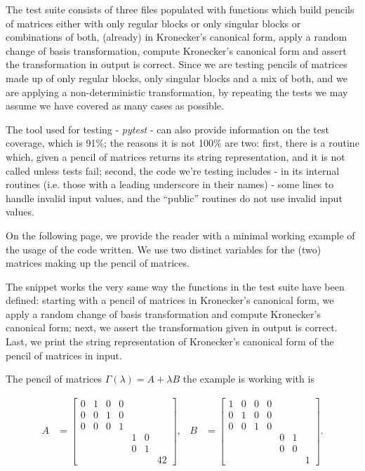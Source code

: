 The test suite consists of three files populated with functions which build pencils of matrices either with
only regular blocks or only singular blocks or combinations of both, (already) in Kronecker's canonical form,
apply a random change of basis transformation, compute Kronecker's canonical form and assert the transformation
in output is correct. Since we are testing pencils of matrices made up of only regular blocks, only singular blocks
and a mix of both, and we are applying a non-deterministic transformation, by repeating the tests we may assume
we have covered as many cases as possible.

The tool used for testing - \textit{pytest} - can also provide information on
the test coverage, which is 91\%; the reasons it is not 100\% are two: first, there is a routine which, given a
pencil of matrices returns its string representation, and it is not called unless tests fail; second, the code
we're testing includes - in its internal routines (i.e. those with a leading underscore in their names) - some
lines to handle invalid input values, and the ``public'' routines do not use invalid input values.

On the following page, we provide the reader with a minimal working example of the usage of the code written. We
use two distinct variables for the (two) matrices making up the pencil of matrices.

The snippet works the very same way the functions in the test suite have been defined: starting with a pencil
of matrices in Kronecker's canonical form, we apply a random change of basis transformation and compute Kronecker's
canonical form; next, we assert the transformation given in output is correct. Last, we print the string
representation of Kronecker's canonical form of the pencil of matrices in input.

The pencil of matrices \(\Gamma(\lambda) = A + \lambda B\) the example is working with is

\begin{align*}
    A &=
    \begin{bmatrix}
        0 & 1 & 0 & 0 \\
        0 & 0 & 1 & 0 \\
        0 & 0 & 0 & 1 \\
        & & & & 1 & 0 \\
        & & & & 0 & 1 \\
        & & & & & & 42
    \end{bmatrix}, &
    B &=
    \begin{bmatrix}
        1 & 0 & 0 & 0 \\
        0 & 1 & 0 & 0 \\
        0 & 0 & 1 & 0 \\
        & & & & 0 & 1 \\
        & & & & 0 & 0 \\
        & & & & & & 1
    \end{bmatrix}.
\end{align*}

